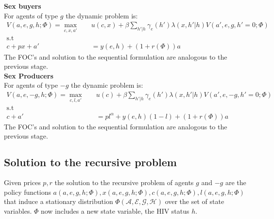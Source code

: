 \noindent\textbf{Sex buyers}\\
For agents of type $g$ the dynamic problem is: 
 \begin{align*}
V(a,e,g,h;\Phi) = \max_{c,x,a'} \quad  & u(c,x) + \beta \sum_{h'|h} \gamma_e(h') \lambda(x,h'|h) V(a',e,g,h'=0;\Phi)\\
\mbox{s.t}\\
c+ px +a'&= y(e,h) + (1+r(\Phi))a 
\end{align*}
The FOC's and solution to the sequential formulation are analogous to the previous stage.\\
\noindent\textbf{Sex Producers}\\
For agents of type $-g$ the dynamic problem is: 
 \begin{align*}
V(a,e,-g,h;\Phi) = \max_{c,l,a'} \quad &  u(c) + \beta  \sum_{h'|h} \gamma_e(h') \lambda(x,h'|h)  V(a',e,-g,h'=0;\Phi)\\
\mbox{s.t}\\
c +a'&= pl^{\alpha} + y(e,h)(1-l) + (1+r(\Phi))a   
\end{align*}
The FOC's and solution to the sequential formulation are analogous to the previous stage.
\subsection*{Solution to the recursive problem}
 Given prices $p,r$ the solution to the recursive problem of agents $g$ and $-g$  are the policy functions $a(a,e,g,h;\Phi), x(a,e,g,h;\Phi), c(a,e,g,h;\Phi), l(a,e,g,h;\Phi)$ that induce a stationary distribution $\Phi(\mathcal{A,E,G,H})$ over the set of state variables. $\Phi$ now includes a new state variable, the HIV status $h$.
